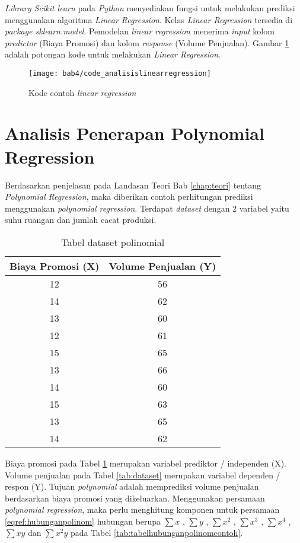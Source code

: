 \textit{Library Scikit learn} pada \textit{Python} menyediakan fungsi untuk melakukan prediksi menggunakan algoritma \textit{Linear Regression}. Kelas \textit{Linear Regression} tersedia di \textit{package sklearn.model}. Pemodelan \textit{linear regression} menerima \textit{input} kolom \textit{predictor} (Biaya Promosi) dan kolom \textit{response} (Volume Penjualan). Gambar \ref{fig:code_analisislinearregression} adalah potongan kode untuk melakukan \textit{Linear Regression}.


\begin{figure}[H]
	\centering  
	\texttt{[image: bab4/code\_analisislinearregression]}   
	\caption{Kode contoh \textit{linear regression}}
	\label{fig:code_analisislinearregression} 
\end{figure} 


\section{Analisis Penerapan Polynomial Regression}
Berdasarkan penjelasan pada Landasan Teori Bab \ref{chap:teori} tentang \textit{Polynomial Regression}, maka diberikan contoh perhitungan prediksi menggunakan \textit{polynomial regression}. Terdapat \textit{dataset} dengan 2 variabel yaitu suhu ruangan dan jumlah cacat produksi.

\begin{table}[H]
\caption{Tabel dataset polinomial }
\centering
\begin{tabular}{|c|c|}
\hline 
Biaya Promosi (X) & Volume Penjualan (Y) \\ 
\hline 
12 & 56 \\ 
\hline 
14 & 62 \\ 
\hline 
13 & 60 \\ 
\hline 
12 & 61 \\ 
\hline 
15 & 65 \\ 
\hline 
13 & 66 \\ 
\hline 
14 & 60 \\ 
\hline 
15 & 63 \\ 
\hline 
13 & 65 \\ 
\hline 
14 & 62 \\ 
\hline 
\end{tabular} 
\label{tab:datasetpolynom}
\end{table}

Biaya promosi pada Tabel \ref{tab:datasetpolynom} merupakan variabel prediktor / independen (X). Volume penjualan pada Tabel \ref{tab:dataset} merupakan variabel dependen / respon (Y). Tujuan \textit{polynomial} adalah memprediksi volume penjualan berdasarkan biaya promosi yang dikeluarkan. Menggunakan persamaan \textit{polynomial regression}, maka perlu menghitung komponen untuk persamaan \eqref{eqref:hubunganpolinom} hubungan berupa $\sum x$ , $\sum y$ , $\sum x^2$ , $\sum x^3$ , $\sum x^4$ , $\sum xy$ dan $\sum x^2 y$ pada Tabel \ref{tab:tabelhubunganpolinomcontoh}.

